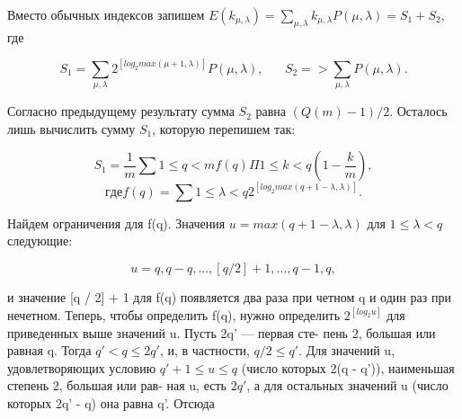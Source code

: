\documentclass{../template/mai_book}
\begin{document}
\begin{myproof}
 Вместо обычных индексов запишем $E(k_{\mu, \lambda}) = \sum_{\mu, \lambda} k_{\mu, \lambda}P(\mu, \lambda) = S_{1} + S_{2}$, \linebreak \indent где \par
 
 $$S_{1} = \sum_{\mu, \lambda} 2^{[log_{2} max(\mu + 1,\lambda)]} P(\mu, \lambda), \;\;\;\;\;\; S_{2} = >\sum_{\mu, \lambda}P(\mu, \lambda).$$ \par 
 
 Согласно предыдущему результату сумма $S_{2}$ равна $(Q(m) - 1)/2$. \linebreak \indent Осталось лишь вычислить сумму $S_{1}$, которую перепишем так: \linebreak \newpage 
 

$$S_{1} = \frac{1}{m} \sum{1 \leqslant q < m} f(q) \Pi {1 \leqslant k < q} (1 - \frac{k}{m}),$$ \linebreak 
$$где f(q) = \sum{1 \leqslant \lambda < q} 2^{[log_{2}max(q+1-\lambda,\lambda)]}.$$ \par 

\noindent Найдем ограничения для f(q). Значения $u = max(q + 1 - \lambda, \lambda)$ для \linebreak \noindent $1 \leqslant \lambda < q$ следующие: \par

$$u = q, q - q, ...,[q/2] + 1, ..., q - 1, q,$$ \par

\indent и значение [q / 2] + 1 для f(q) появляется два раза при четном q и один раз \linebreak \indent при нечетном. Теперь, чтобы определить f(q), нужно определить \linebreak \indent $2^{[log_{2}u]}$ для приведенных выше значений u. Пусть 2q' --- первая сте- \linebreak \indent пень 2, большая или равная q. Тогда $q' < q \leqslant 2q'$, и, в частности, \linebreak \indent $q/2 \leqslant q'$. Для значений u, удовлетворяющих условию $q' + 1 \leqslant u \leqslant q$ \linebreak \indent (число которых 2(q - q')), наименьшая степень 2, большая или рав- \linebreak \indent  ная u, есть $2q'$, а для остальных значений u (число которых 2q' - q) \linebreak \indent она равна q'. Отсюда \par 


\end{myproof}
\end{document}
